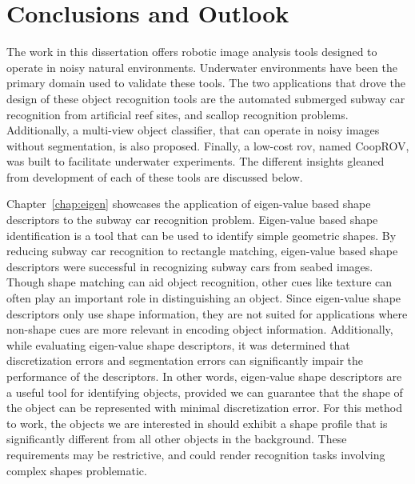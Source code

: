 
\chapter{Conclusions and Outlook}
\label{chap:thesis_conclusion}


The work in this dissertation offers robotic image analysis tools designed to operate in noisy natural environments. 
Underwater environments have been the primary domain used to validate these tools.
The two applications that drove the design of these object recognition tools are the automated submerged subway car recognition
from artificial reef sites, and scallop recognition problems.
Additionally, a multi-view object classifier, that can operate in noisy images without segmentation, is also proposed.
Finally, a low-cost \gls{rov}, named CoopROV, was built to facilitate underwater experiments. The different insights gleaned from development of each of these tools are discussed below.

Chapter~\ref{chap:eigen} showcases the application of eigen-value based shape descriptors to the subway car recognition problem. 
Eigen-value based shape identification is a tool that can be used to identify simple geometric shapes. 
By reducing subway car recognition to rectangle matching, eigen-value based shape descriptors were
successful in recognizing subway cars from seabed images.
Though shape matching can aid object recognition, other cues like texture can often play an important role
in distinguishing an object. Since eigen-value shape descriptors only use shape information, 
they are not suited for applications where non-shape cues are more relevant in encoding object information. 
Additionally, while evaluating eigen-value shape descriptors, it was determined that 
discretization errors and segmentation errors can significantly impair the performance of the descriptors.
In other words, eigen-value shape descriptors are a useful tool for identifying
objects, provided we can guarantee that the shape of the object can be represented with minimal discretization error. 
For this method to work, the objects
we are interested in should exhibit a shape profile that is significantly different from
all other objects in the background. These requirements may be restrictive, and could render recognition tasks involving 
complex shapes problematic. 

